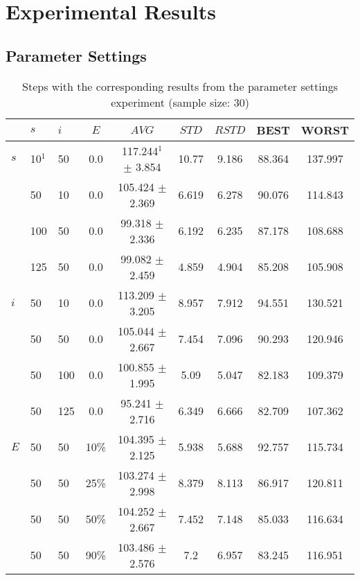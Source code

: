 \chapter{Experimental Results}
\label{appendixC}

\section{Parameter Settings}

\begin{sidewaystable}
    \centering
    \begin{tabular}{|l|l|l|c||c|c|c|c|c|}
    \hline
    ~ & $s$ & $i$ & $E$ & $AVG$ & $STD$ & $RSTD$ & BEST & WORST \\
    \hline
    $s$ & 10$^1$ & 50 & 0.0 & 117.244$^1$ $\pm$ 3.854 & 10.77 & 9.186 & 88.364 & 137.997\\
    ~ & 50 & 10 & 0.0 & 105.424 $\pm$ 2.369 & 6.619 & 6.278 & 90.076 & 114.843\\
    ~ & 100 & 50 & 0.0 & 99.318 $\pm$ 2.336 & 6.192 & 6.235 & 87.178 & 108.688\\
    ~ & 125 & 50 & 0.0 & 99.082 $\pm$ 2.459 & 4.859 & 4.904 & 85.208 & 105.908\\
    \hline
    $i$ & 50 & 10 & 0.0 & 113.209 $\pm$ 3.205 & 8.957 & 7.912 & 94.551 & 130.521\\
    ~ & 50 & 50 & 0.0 & 105.044 $\pm$ 2.667 & 7.454 & 7.096 & 90.293 & 120.946\\
    ~ & 50 & 100 & 0.0 & 100.855 $\pm$ 1.995 & 5.09 & 5.047 & 82.183 & 109.379\\
    ~ & 50 & 125 & 0.0 & 95.241 $\pm$ 2.716 & 6.349 & 6.666 & 82.709 & 107.362\\
    \hline
    $E$ & 50 & 50 & 10\% & 104.395 $\pm$ 2.125 & 5.938 & 5.688 & 92.757 & 115.734\\
    ~ & 50 & 50 & 25\% & 103.274 $\pm$ 2.998 & 8.379 & 8.113 & 86.917 & 120.811\\
    ~ & 50 & 50 & 50\% & 104.252 $\pm$ 2.667 & 7.452 & 7.148 & 85.033 & 116.634\\
    ~ & 50 & 50 & 90\% & 103.486 $\pm$ 2.576 & 7.2 & 6.957 & 83.245 & 116.951\\
    \hline
    \end{tabular}
    \caption {Steps with the corresponding results from the parameter settings experiment (sample size: 30)}
    \tiny
    \begin{itemize}[noitemsep]

\end{itemize}
\end{sidewaystable}
